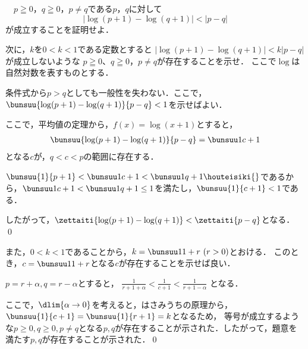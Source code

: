 \begin{problem}
  　$p\geqq0$，$q\geqq0$，$p \neq q$である$p$，$q$に対して
\[ |\log(p+1)-\log(q+1)|<|p-q| \]
が成立することを証明せよ．

次に，$k$を$0<k<1$である定数とすると
$|\log(p+1)-\log(q+1)|<k|p-q|$が成立しないような
$p\geqq0$、$q\geqq0$，$p \neq q$が存在することを示せ．
ここで$\log$は自然対数を表すものとする．
\end{problem}


\noindent\kaie

条件式から$p>q$としても一般性を失わない．ここで，
$\bunsuu{\log(p+1) - \log(q+1)}{p-q} < 1$を示せばよい．

ここで，平均値の定理から，$f(x) = \log(x+1)$とすると，
\begin{align}
\bunsuu{\log(p+1) - \log(q+1)}{p-q} = \bunsuu1{c+1} \label{197441}
\end{align}
となる$c$が，$q < c < p$の範囲に存在する．

$\bunsuu{1}{p+1} < \bunsuu1{c+1} < \bunsuu1{q+1} \houteisiki{\label{197442}}$であるから，$\bunsuu1{c+1} < \bunsuu1{q+1} \leq 1$を満たし，$\bunsuu{1}{c+1} < 1$である．

したがって，$\zettaiti{\log(p+1) - \log(q+1)} < \zettaiti{p-q}$となる．
\qed

また，$0 < k < 1$であることから，$k = \bunsuu1{1+r}\ (r>0)$とおける．
このとき，$c = \bunsuu1{1+r}$となる$c$が存在することを示せば良い．

$p = r + \alpha, q = r - \alpha$とすると，
$\frac{1}{r+1+\alpha} < \frac{1}{c+1} < \frac{1}{r+1-\alpha}$
となる．

ここで，$\dlim{\alpha \to 0}$を考えると，はさみうちの原理から，
$\bunsuu{1}{c+1} = \bunsuu{1}{r+1} = k$となるため，
等号が成立するような$p \geq 0, q \geq 0, p \neq q$となる$p,q$が存在することが示された．したがって，題意を満たす$p,q$が存在することが示された．\qed
